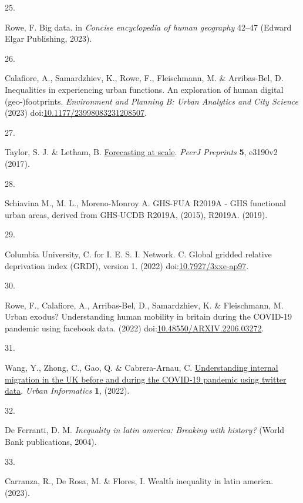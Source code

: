\documentclass[
  11pt,
]{article}
\newlength{\cslhangindent}
\newlength{\csllabelwidth}
\newenvironment{CSLReferences}[2] %
 {\begin{list}{}{%
  \setlength{\itemindent}{0pt}
  \setlength{\leftmargin}{0pt}
  \setlength{\parsep}{0pt}
  \ifodd #1
   \setlength{\leftmargin}{\cslhangindent}
   \setlength{\itemindent}{-1\cslhangindent}
  \fi
  \setlength{\itemsep}{#2\baselineskip}}}
 {\end{list}}
\newcommand{\CSLLeftMargin}[1]{\parbox[t]{\csllabelwidth}{\strut#1\strut}}
\newcommand{\CSLRightInline}[1]{\parbox[t]{\linewidth - \csllabelwidth}{\strut#1\strut}}
\begin{document}
\begin{CSLReferences}{0}{0}
\CSLLeftMargin{25. }%
\CSLRightInline{Rowe, F. Big data. in \emph{Concise encyclopedia of
human geography} 42--47 (Edward Elgar Publishing, 2023).}

\CSLLeftMargin{26. }%
\CSLRightInline{Calafiore, A., Samardzhiev, K., Rowe, F., Fleischmann,
M. \& Arribas-Bel, D. Inequalities in experiencing urban functions. An
exploration of human digital (geo-)footprints. \emph{Environment and
Planning B: Urban Analytics and City Science} (2023)
doi:\href{https://doi.org/10.1177/23998083231208507}{10.1177/23998083231208507}.}

\CSLLeftMargin{27. }%
\CSLRightInline{Taylor, S. J. \& Letham, B.
\href{https://doi.org/10.7287/peerj.preprints.3190v2}{Forecasting at
scale}. \emph{PeerJ Preprints} \textbf{5}, e3190v2 (2017).}

\CSLLeftMargin{28. }%
\CSLRightInline{Schiavina M., M. L., Moreno-Monroy A. GHS-FUA R2019A -
GHS functional urban areas, derived from GHS-UCDB R2019A, (2015),
R2019A. (2019).}

\CSLLeftMargin{29. }%
\CSLRightInline{Columbia University, C. for I. E. S. I. Network. C.
Global gridded relative deprivation index (GRDI), version 1. (2022)
doi:\href{https://doi.org/10.7927/3xxe-ap97}{10.7927/3xxe-ap97}.}

\CSLLeftMargin{30. }%
\CSLRightInline{Rowe, F., Calafiore, A., Arribas-Bel, D., Samardzhiev,
K. \& Fleischmann, M. Urban exodus? Understanding human mobility in
britain during the COVID-19 pandemic using facebook data. (2022)
doi:\href{https://doi.org/10.48550/ARXIV.2206.03272}{10.48550/ARXIV.2206.03272}.}

\CSLLeftMargin{31. }%
\CSLRightInline{Wang, Y., Zhong, C., Gao, Q. \& Cabrera-Arnau, C.
\href{https://doi.org/10.1007/s44212-022-00018-w}{Understanding internal
migration in the UK before and during the COVID-19 pandemic using
twitter data}. \emph{Urban Informatics} \textbf{1}, (2022).}

\CSLLeftMargin{32. }%
\CSLRightInline{De Ferranti, D. M. \emph{Inequality in latin america:
Breaking with history?} (World Bank publications, 2004).}

\CSLLeftMargin{33. }%
\CSLRightInline{Carranza, R., De Rosa, M. \& Flores, I. Wealth
inequality in latin america. (2023).}


\end{CSLReferences}
\end{document}
